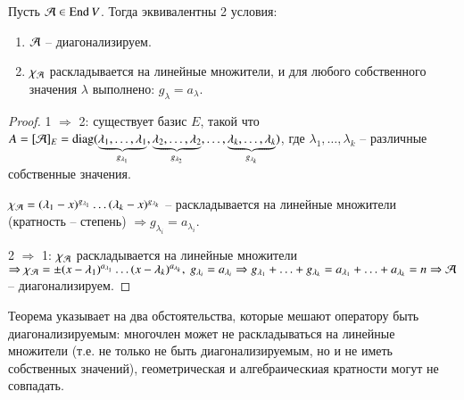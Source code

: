 \documentclass[main]{subfiles}
\begin{document}
\begin{theorem}
    Пусть $\mathcal{A} \in \operatorname{End} V$. Тогда эквивалентны 2 условия:
    \begin{enumerate}
        \item $\mathcal{A}$ -- диагонализируем.
        \item $\chi_{\mathcal{A}}$ раскладывается на линейные множители, и для любого собственного значения $\lambda$ выполнено: $g_{\lambda} = a_{\lambda}$.
    \end{enumerate}
\end{theorem}



\begin{proof}
    1 $\Rightarrow$ 2: существует базис $E$, такой что $A = [\mathcal{A}]_E = \operatorname{diag}(\underbrace{\lambda_1, \ldots, \lambda_1}_{g_{\lambda_1}},
        \underbrace{\lambda_2, \ldots, \lambda_2}_{g_{\lambda_2}}, \ldots, \underbrace{\lambda_k, \ldots, \lambda_k}_{g_{\lambda_k}})$, где $\lambda_1, \ldots, \lambda_k$ -- различные собственные значения.

    $\chi_{\mathcal{A}} = (\lambda_1 - x)^{g_{\lambda_1}}\ldots (\lambda_k - x)^{g_{\lambda_k}}$ -- раскладывается на линейные множители (кратность -- степень)
    $\Rightarrow g_{\lambda_i} = a_{\lambda_i}$.

    2 $\Rightarrow$ 1: $\chi_{\mathcal{A}}$ раскладывается на линейные множители $\Rightarrow \chi_{\mca} = \pm(x-\lambda_1)^{a_{\lambda_1}}\ldots(x-\lambda_k)^{a_{\lambda_k}},\ g_{\lambda_i} = a_{\lambda_i}
        \Rightarrow g_{\lambda_1}+\ldots+g_{\lambda_k} = a_{\lambda_1}+\ldots+a_{\lambda_k} = n \Rightarrow \mca$ -- диагонализируем.
\end{proof}

Теорема указывает на два обстоятельства, которые мешают оператору быть диагонализируемым: многочлен может не раскладываться на линейные множители (т.е. не только не быть диагонализируемым, но и не иметь собственных значений), геометрическая и алгебраическиая кратности могут не совпадать.
\end{document}
